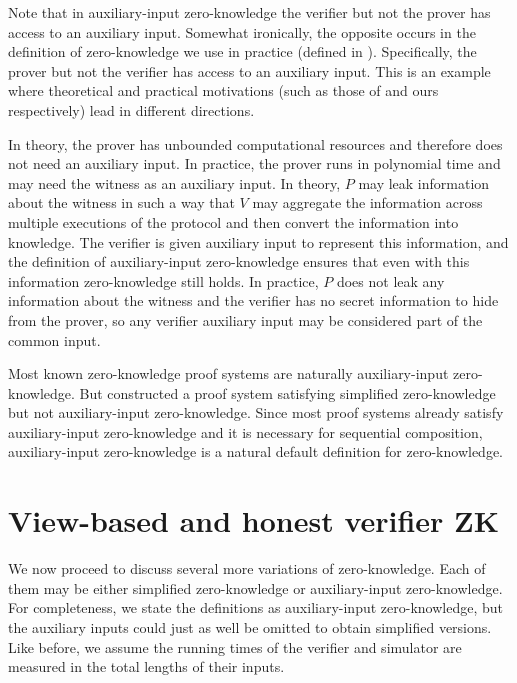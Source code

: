 \begin{remark}
    Note that in auxiliary-input zero-knowledge the verifier but not the prover has access to an auxiliary input.
    Somewhat ironically, the opposite occurs in the definition of zero-knowledge we use in practice (defined in \link[?]{}).
    Specifically, the prover but not the verifier has access to an auxiliary input.
    This is an example where theoretical and practical motivations (such as those of \cite{GO90} and ours respectively) lead in different directions.

    In theory, the prover has unbounded computational resources and therefore does not need an auxiliary input.
    In practice, the prover runs in polynomial time and may need the witness as an auxiliary input.
    In theory, $P$ may leak information about the witness in such a way that $V$ may aggregate the information across multiple executions of the protocol and then convert the information into knowledge.
    The verifier is given auxiliary input to represent this information, and the definition of auxiliary-input zero-knowledge ensures that even with this information zero-knowledge still holds.
    In practice, $P$ does not leak any information about the witness and the verifier has no secret information to hide from the prover, so any verifier auxiliary input may be considered part of the common input.
\end{remark}

Most known zero-knowledge proof systems are naturally auxiliary-input zero-knowledge.
But \cite{GK96} constructed a proof system satisfying simplified zero-knowledge but not auxiliary-input zero-knowledge.
Since most proof systems already satisfy auxiliary-input zero-knowledge and it is necessary for sequential composition, auxiliary-input zero-knowledge is a natural default definition for zero-knowledge.


\section{View-based and honest verifier ZK}

We now proceed to discuss several more variations of zero-knowledge.
Each of them may be either simplified zero-knowledge or auxiliary-input zero-knowledge.
For completeness, we state the definitions as auxiliary-input zero-knowledge, but the auxiliary inputs could just as well be omitted to obtain simplified versions.
Like before, we assume the running times of the verifier and simulator are measured in the total lengths of their inputs.

